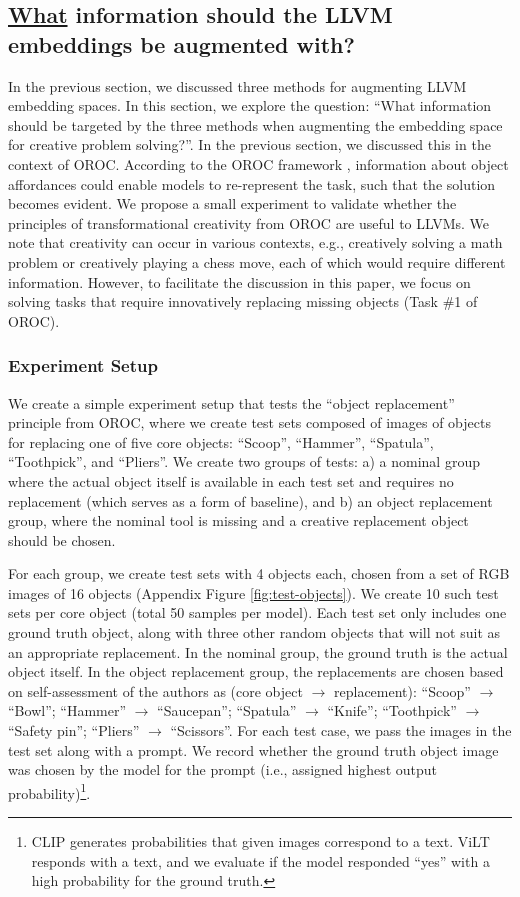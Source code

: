 \subsection{\underline{What} information should the LLVM embeddings be augmented with?}
In the previous section, we discussed three methods for augmenting LLVM embedding spaces. In this section, we explore the question: ``What information should be targeted by the three methods when augmenting the embedding space for creative problem solving?''. In the previous section, we discussed this in the context of OROC. According to the OROC framework \cite{oltecteanu2016object}, information about object affordances could enable models to re-represent the task, such that the solution becomes evident. We propose a small experiment to validate whether the principles of transformational creativity from OROC are useful to LLVMs. We note that creativity can occur in various contexts, e.g., creatively solving a math problem or creatively playing a chess move, each of which would require different information. However, to facilitate the discussion in this paper, we focus on solving tasks that require innovatively replacing missing objects (Task \#1 of OROC).

\subsubsection{Experiment Setup}

We create a simple experiment setup that tests the ``object replacement'' principle from OROC, where we create test sets composed of images of objects for replacing one of five core objects: ``Scoop'', ``Hammer'', ``Spatula'', ``Toothpick'', and ``Pliers''. We create two groups of tests: a) a nominal group where the actual object itself is available in each test set and requires no replacement (which serves as a form of baseline), and b) an object replacement group, where the nominal tool is missing and a creative replacement object should be chosen. 

For each group, we create test sets with 4 objects each, chosen from a set of RGB images of 16 objects (Appendix Figure \ref{fig:test-objects}). We create 10 such test sets per core object (total 50 samples per model). Each test set only includes one ground truth object, along with three other random objects that will not suit as an appropriate replacement. In the nominal group, the ground truth is the actual object itself. In the object replacement group, the replacements are chosen based on self-assessment of the authors as (core object $\xrightarrow{}$ replacement): ``Scoop'' $\xrightarrow{}$ ``Bowl''; ``Hammer'' $\xrightarrow{}$ ``Saucepan''; ``Spatula'' $\xrightarrow{}$ ``Knife''; ``Toothpick'' $\xrightarrow{}$ ``Safety pin''; ``Pliers'' $\xrightarrow{}$ ``Scissors''. For each test case, we pass the images in the test set along with a prompt. We record whether the ground truth object image was chosen by the model for the prompt (i.e., assigned highest output probability)\footnote{CLIP generates probabilities that given images correspond to a text. ViLT responds with a text, and we evaluate if the model responded ``yes'' with a high probability for the ground truth.}.

